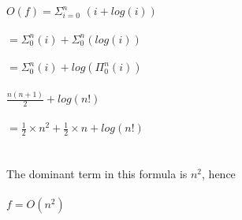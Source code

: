 \documentclass{article}
\begin{document}
\noindent$O(f) = \Sigma_{i=0}^{n}$ $(i + log(i))$\\
\\
$= \Sigma_0^n (i) + \Sigma_0^n \left(log(i)\right)$\\
\\
$=\Sigma_0^n (i) + log(\Pi_0^n(i))$\\
\\
$\frac{n(n+1)}{2} + log(n!)$\\
\\
$= \frac{1}{2}\times n^2 + \frac{1}{2} \times n + log(n!)$\\
\\
\\
The dominant term in this formula is $n^2$, hence\\
\\
$f = O(n^2)$
\end{document}
